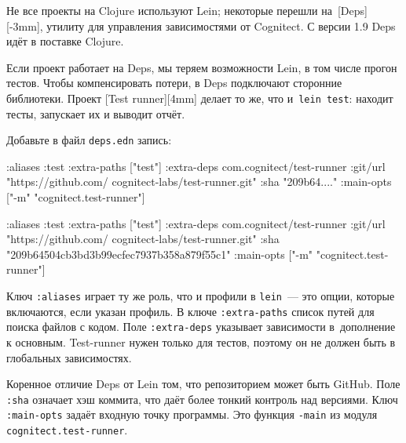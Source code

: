 
Не все проекты на Clojure используют Lein; некоторые перешли
на~[Deps][-3mm],
утилиту для управления зависимостями от Cognitect. С версии 1.9 Deps идёт в
поставке Clojure.


Если проект работает на Deps, мы теряем возможности Lein, в том числе прогон
тестов. Чтобы компенсировать потери, в Deps подключают сторонние
библиотеки. Проект [Test runner][4mm]
делает то же, что и~\verb|lein test|: находит тесты, запускает их и выводит
отчёт.

Добавьте в файл \verb|deps.edn| запись:

\ifnarrow

\begin{english}
  \begin{clojure}
:aliases
{:test
 {:extra-paths ["test"]
  :extra-deps
  {com.cognitect/test-runner
   {:git/url
    "https://github.com/
         cognitect-labs/test-runner.git"
    :sha "209b64...."}}
  :main-opts
  ["-m" "cognitect.test-runner"]}}
  \end{clojure}
\end{english}

\else

\begin{english}
  \begin{clojure}
:aliases
{:test
 {:extra-paths ["test"]
  :extra-deps
  {com.cognitect/test-runner
   {:git/url "https://github.com/
              cognitect-labs/test-runner.git"
    :sha "209b64504cb3bd3b99ecfec7937b358a879f55c1"}}
  :main-opts ["-m" "cognitect.test-runner"]}}
  \end{clojure}
\end{english}

\fi


Ключ \verb|:aliases| играет ту же роль, что и профили в \verb|lein|~--- это
опции, которые включаются, если указан профиль. В ключе \verb|:extra-paths|
список путей для поиска файлов с кодом. Поле \verb|:extra-deps| указывает
зависимости в~дополнение к основным. Test-runner нужен только для тестов,
поэтому он не должен быть в глобальных зависимостях.

Коренное отличие Deps от Lein том, что репозиторием может быть GitHub. Поле
\verb|:sha| означает хэш коммита, что даёт более тонкий контроль над
версиями. Ключ \verb|:main-opts| задаёт входную точку программы. Это функция
\verb|-main| из модуля \verb|cognitect.test-runner|.

